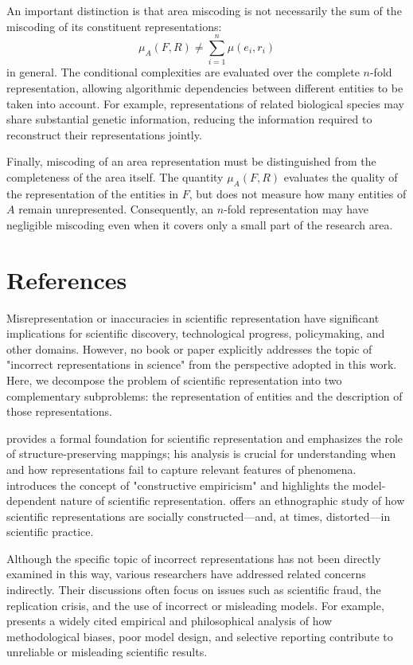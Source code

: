 An important distinction is that area miscoding is not necessarily the sum of the miscoding of its constituent representations:
\[
\mu_A(F,R) \neq \sum_{i=1}^{n}\mu(e_i,r_i)
\]
in general. The conditional complexities are evaluated over the complete $n$-fold representation, allowing algorithmic dependencies between different entities to be taken into account. For example, representations of related biological species may share substantial genetic information, reducing the information required to reconstruct their representations jointly.

Finally, miscoding of an area representation must be distinguished from the completeness of the area itself. The quantity $\mu_A(F,R)$ evaluates the quality of the representation of the entities in $F$, but does not measure how many entities of $A$ remain unrepresented. Consequently, an $n$-fold representation may have negligible miscoding even when it covers only a small part of the research area.

%
%

\section*{References}

Misrepresentation or inaccuracies in scientific representation have significant implications for scientific discovery, technological progress, policymaking, and other domains. However, no book or paper explicitly addresses the topic of "incorrect representations in science" from the perspective adopted in this work. Here, we decompose the problem of scientific representation into two complementary subproblems: the representation of entities and the description of those representations.

\cite{suppes2002representation} provides a formal foundation for scientific representation and emphasizes the role of structure-preserving mappings; his analysis is crucial for understanding when and how representations fail to capture relevant features of phenomena. \cite{van1980scientific} introduces the concept of "constructive empiricism" and highlights the model-dependent nature of scientific representation. \cite{latour2013laboratory} offers an ethnographic study of how scientific representations are socially constructed—and, at times, distorted—in scientific practice.

Although the specific topic of incorrect representations has not been directly examined in this way, various researchers have addressed related concerns indirectly. Their discussions often focus on issues such as scientific fraud, the replication crisis, and the use of incorrect or misleading models. For example, \cite{ioannidis2005most} presents a widely cited empirical and philosophical analysis of how methodological biases, poor model design, and selective reporting contribute to unreliable or misleading scientific results.






